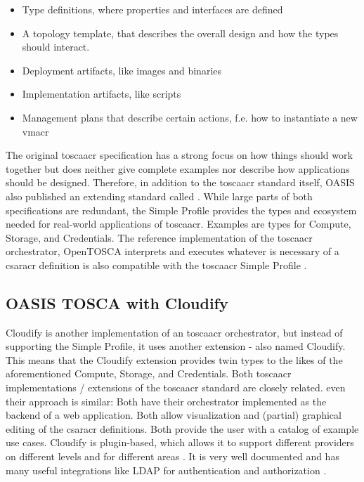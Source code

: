 \begin{itemize}
  \item Type definitions, where properties and interfaces are defined
  \item A topology template, that describes the overall design and how the types should interact.
  \item Deployment artifacts, like images and binaries
  \item Implementation artifacts, like scripts
  \item Management plans that describe certain actions, f.e. how to instantiate a new \gls{vmacr}
\end{itemize}
The original \gls{toscaacr} specification has a strong focus on how things should work together but does neither give complete examples nor describe how applications should be designed. Therefore, in addition to the \gls{toscaacr} standard itself, OASIS also published an extending standard called  \cite{tosca_simple_profile_v1_3}. While large parts of both specifications are redundant, the Simple Profile provides the types and ecosystem needed for real-world applications of \gls{toscaacr}. Examples are types for Compute, Storage, and Credentials. The reference implementation of the \gls{toscaacr} orchestrator, OpenTOSCA interprets and executes whatever is necessary of a \gls{csaracr} definition is also compatible with the \gls{toscaacr} Simple Profile \cite{opentosca_how_to_csar}.

\subsection{OASIS TOSCA with Cloudify}
Cloudify is another implementation of an \gls{toscaacr} orchestrator, but instead of supporting the Simple Profile, it uses another extension - also named Cloudify. This means that the Cloudify extension provides twin types to the likes of the aforementioned Compute, Storage, and Credentials.
Both \gls{toscaacr} implementations / extensions of the \gls{toscaacr} standard are closely related. even their approach is similar: Both have their orchestrator implemented as the backend of a web application. Both allow visualization and (partial) graphical editing of the \gls{csaracr} definitions. Both provide the user with a catalog of example use cases.
\newline
Cloudify is plugin-based, which allows it to support different providers on different levels and for different areas \cite{cloudify_plugins}. It is very well documented and has many useful integrations like LDAP for authentication and authorization \cite{cloudify_ldap_integration}.


